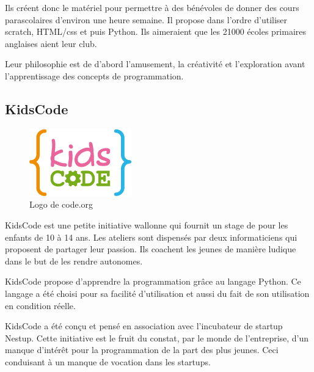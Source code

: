 Ils créent donc le matériel pour permettre à des bénévoles de donner des cours parascolaires d'environ une heure semaine. Il propose dans l'ordre d'utiliser scratch, HTML/css et puis Python. Ils aimeraient que les 21000 écoles primaires anglaises aient leur club.

Leur philosophie est de d'abord l'amusement, la créativité et l'exploration avant l'apprentissage des concepts de programmation.
\subsection{KidsCode}
\begin{figure}[!h]
  \begin{center}
    \includegraphics[scale=0.5]{content/5-related_work/images/kidscode}
    \caption{Logo de code.org}
    \label{fig:code.org}
  \end{center}
\end{figure}
KidsCode est une petite initiative wallonne qui fournit un stage de pour les enfants de 10 à 14 ans. Les ateliers sont dispensés par deux informaticiens qui proposent de partager leur passion. Ils coachent les jeunes de manière ludique dans le but de les rendre autonomes.

KidsCode propose d'apprendre la programmation grâce au langage Python. Ce langage a été choisi pour sa facilité d'utilisation et aussi du fait de son utilisation en condition réelle. 

KidsCode a été conçu et pensé en association avec l'incubateur de startup Nestup. Cette initiative est le fruit du constat, par le monde de l'entreprise, d'un manque d'intérêt pour la programmation de la part des plus jeunes. Ceci conduisant à un manque de vocation dans les startups.
